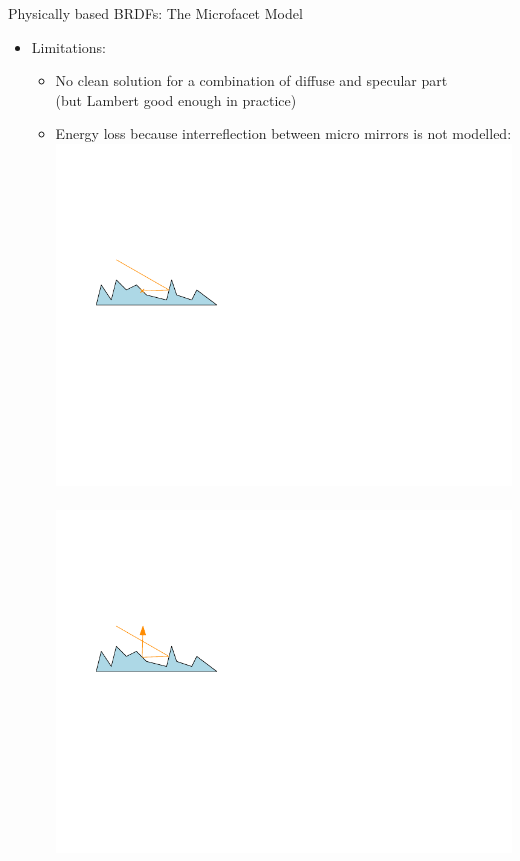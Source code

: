 \documentclass[utf8,stillsansserifmath,fleqn,t]{beamer}
\begin{document}
\begin{frame}
\frametitle{\insertsection}
Physically based BRDFs: The Microfacet Model
\begin{itemize}
\item Limitations:
    \begin{itemize}
    \item No clean solution for a combination of diffuse and specular part\\
        (but Lambert good enough in practice)
    \item Energy loss because interreflection between micro mirrors is not modelled:\\
    \includegraphics[width=.33\textwidth]{./fig/microfacets-interreflection-0.pdf}~~~
    \includegraphics[width=.33\textwidth]{./fig/microfacets-interreflection-1.pdf}
    \end{itemize}
\end{itemize}
\end{frame}
\end{document}
